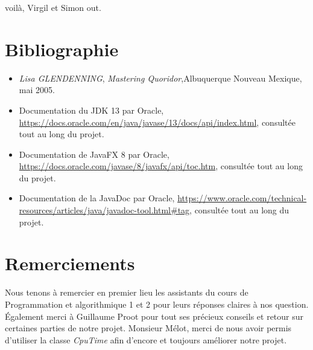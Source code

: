 \documentclass[a4paper, 12pt]{article}
\begin{document}
voilà, Virgil et Simon out.

\section{Bibliographie}
\begin{itemize}
\item \emph{Lisa GLENDENNING}, \textit{Mastering Quoridor},Albuquerque Nouveau Mexique, mai 2005.
\item Documentation du JDK 13 par Oracle, \url{https://docs.oracle.com/en/java/javase/13/docs/api/index.html}, consultée tout au long du projet.
\item Documentation de JavaFX 8 par Oracle, \url{https://docs.oracle.com/javase/8/javafx/api/toc.htm}, consultée tout au long du projet.
\item Documentation de la JavaDoc par Oracle, \url{https://www.oracle.com/technical-resources/articles/java/javadoc-tool.html#tag}, consultée tout au long du projet.
\end{itemize}

\section{Remerciements}

Nous tenons à remercier en premier lieu les assistants du cours de Programmation et algorithmique 1 et 2 pour leurs réponses claires à nos question.
Également merci à Guillaume Proot pour tout ses précieux conseils et retour sur certaines parties de notre projet.
Monsieur Mélot, merci de nous avoir permis d'utiliser la classe \textit{CpuTime} afin d'encore et toujours améliorer notre projet.
\end{document}
